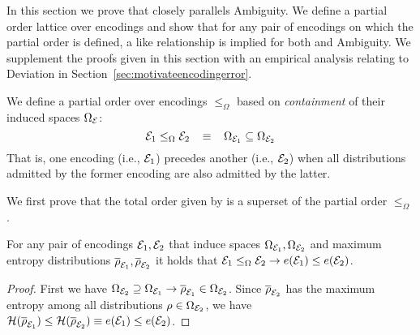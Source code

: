 In this section we prove that \errorname closely parallels Ambiguity. 
We define a partial order lattice over encodings and show that for any pair of encodings on which the partial order is defined, a like relationship is implied for both \errorname and Ambiguity.
We supplement the proofs given in this section with an empirical analysis relating \errorname to Deviation in Section~\ref{sec:motivateencodingerror}.



We define a partial order over encodings $\leq_\Omega$ based on \textit{containment} of their induced spaces $\Omega_\mathcal E$:
$$\mathcal E_1 \leq_\Omega \mathcal E_2\;\;\;\equiv\;\;\;\Omega_{\mathcal E_1} \subseteq \Omega_{\mathcal E_2}$$
That is, one encoding (i.e., $\mathcal E_1$) precedes another (i.e., $\mathcal E_2$) when all distributions admitted by the former encoding are also admitted by the latter.


We first prove that the total order given by \errorname is a superset of the partial order $\leq_\Omega$. 
\begin{lemma}
\label{prop:monotone}
For any pair of encodings $\mathcal E_1,\mathcal E_2$ that induce spaces $\Omega_{\mathcal E_1},\Omega_{\mathcal E_2}$ and maximum entropy distributions $\overline{\rho}_{\mathcal E_1},\overline{\rho}_{\mathcal E_2}$ it holds that $\mathcal E_1 \leq_\Omega \mathcal E_2\to e(\mathcal E_1)\leq e(\mathcal E_2)$. 
\end{lemma}
\begin{proof} 
First we have $\Omega_{\mathcal E_2}\supseteq \Omega_{\mathcal E_1}\to\overline{\rho}_{\mathcal E_1}\in\Omega_{\mathcal E_2}$. Since $\overline{\rho}_{\mathcal E_2}$ has the maximum entropy among all distributions $\rho\in\Omega_{\mathcal E_2}$, we have $\mathcal{H}(\overline{\rho}_{\mathcal E_1})\leq\mathcal{H}(\overline{\rho}_{\mathcal E_2})\equiv e(\mathcal E_1)\leq e(\mathcal E_2)$. 
\end{proof}

